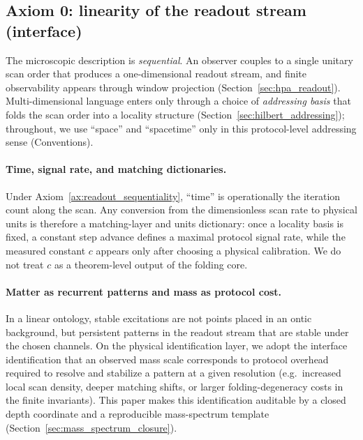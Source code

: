 \subsection{Axiom 0: linearity of the readout stream (interface)}
\label{subsec:axiom0_linearity}
\begin{axiom}\label{ax:readout_sequentiality}
The microscopic description is \emph{sequential}.
An observer couples to a single unitary scan order that produces a one-dimensional readout stream, and finite observability appears through window projection (Section~\ref{sec:hpa_readout}).
Multi-dimensional language enters only through a choice of \emph{addressing basis} that folds the scan order into a locality structure (Section~\ref{sec:hilbert_addressing}); throughout, we use ``space'' and ``spacetime'' only in this protocol-level addressing sense (Conventions).
\end{axiom}

\paragraph{Time, signal rate, and matching dictionaries.}
Under Axiom~\ref{ax:readout_sequentiality}, ``time'' is operationally the iteration count along the scan.
Any conversion from the dimensionless scan rate to physical units is therefore a matching-layer and units dictionary: once a locality basis is fixed, a constant step advance defines a maximal protocol signal rate, while the measured constant $c$ appears only after choosing a physical calibration.
We do not treat $c$ as a theorem-level output of the folding core.

\paragraph{Matter as recurrent patterns and mass as protocol cost.}
In a linear ontology, stable excitations are not points placed in an ontic background, but persistent patterns in the readout stream that are stable under the chosen channels.
On the physical identification layer, we adopt the interface identification that an observed mass scale corresponds to protocol overhead required to resolve and stabilize a pattern at a given resolution (e.g.\ increased local scan density, deeper matching shifts, or larger folding-degeneracy costs in the finite invariants).
This paper makes this identification auditable by a closed depth coordinate and a reproducible mass-spectrum template (Section~\ref{sec:mass_spectrum_closure}).

